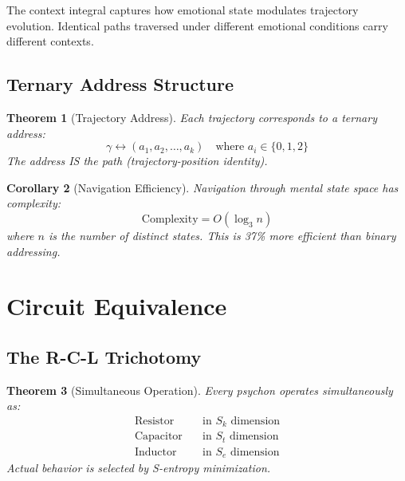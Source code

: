 \documentclass[twocolumn,amsmath,amssymb,aps,prl,superscriptaddress]{revtex4-2}
\newtheorem{theorem}{Theorem}[section]
\newtheorem{corollary}[theorem]{Corollary}
\newcommand{\Sk}{S_k}
\newcommand{\St}{S_t}
\newcommand{\Se}{S_e}
\newcommand{\traj}{\gamma}
\begin{document}
The context integral captures how emotional state modulates trajectory evolution. Identical paths traversed under different emotional conditions carry different contexts.

\subsection{Ternary Address Structure}

\begin{theorem}[Trajectory Address]
\label{thm:address}
Each trajectory corresponds to a ternary address:
\begin{equation}
\traj \leftrightarrow (a_1, a_2, \ldots, a_k) \quad \text{where } a_i \in \{0, 1, 2\}
\end{equation}
The address IS the path (trajectory-position identity).
\end{theorem}

\begin{corollary}[Navigation Efficiency]
Navigation through mental state space has complexity:
\begin{equation}
\text{Complexity} = O(\log_3 n)
\end{equation}
where $n$ is the number of distinct states. This is 37\% more efficient than binary addressing.
\end{corollary}

\section{Circuit Equivalence}
\label{sec:circuits}

\subsection{The R-C-L Trichotomy}

\begin{theorem}[Simultaneous Operation]
\label{thm:rcl}
Every psychon operates simultaneously as:
\begin{align}
\text{Resistor} &\quad \text{in } \Sk \text{ dimension} \\
\text{Capacitor} &\quad \text{in } \St \text{ dimension} \\
\text{Inductor} &\quad \text{in } \Se \text{ dimension}
\end{align}
Actual behavior is selected by S-entropy minimization.
\end{theorem}
\end{document}
